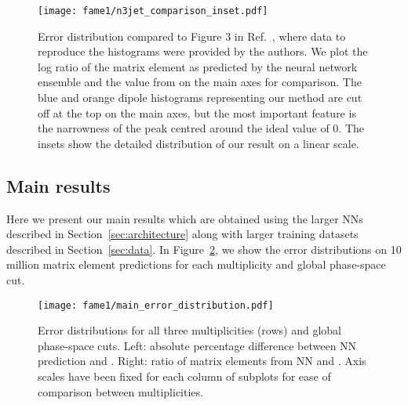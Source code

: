 \documentclass[main.tex]{subfiles}
\begin{document}
\begin{figure}
    \centering
    \texttt{[image: fame1/n3jet\_comparison\_inset.pdf]}
    \caption{Error distribution compared to Figure 3 in Ref.~\cite{Badger:2020uow}, where data to reproduce the histograms were provided by the authors.
    We plot the log ratio of the matrix element as predicted by the neural network ensemble and the value from {\NJet} on the main axes for comparison. The blue and orange dipole histograms representing our method 
    are cut off at the top on the main axes, but the most important feature is the narrowness of the peak centred around the ideal value of 0.
    The insets show the detailed distribution of our result on a linear scale.}
    \label{fig:comparison}
\end{figure}


\subsection{Main results}\label{sec:mainresult}
Here we present our main results which are obtained using the larger NNs described in Section~\ref{sec:architecture} along with larger training datasets described in Section~\ref{sec:data}.
In Figure~\ref{fig:main_error_distribution}, we show the error distributions on 10 million matrix element predictions for each multiplicity and global phase-space cut.

\begin{figure}
    \centering
    \texttt{[image: fame1/main\_error\_distribution.pdf]}
    \caption{Error distributions for all three multiplicities (rows) and global phase-space cuts.
    Left: absolute percentage difference between NN prediction and {\NJet}.
    Right: ratio of matrix elements from NN and {\NJet}.
    Axis scales have been fixed for each column of subplots for ease of comparison between multiplicities.}
    \label{fig:main_error_distribution}
\end{figure}
\end{document}

